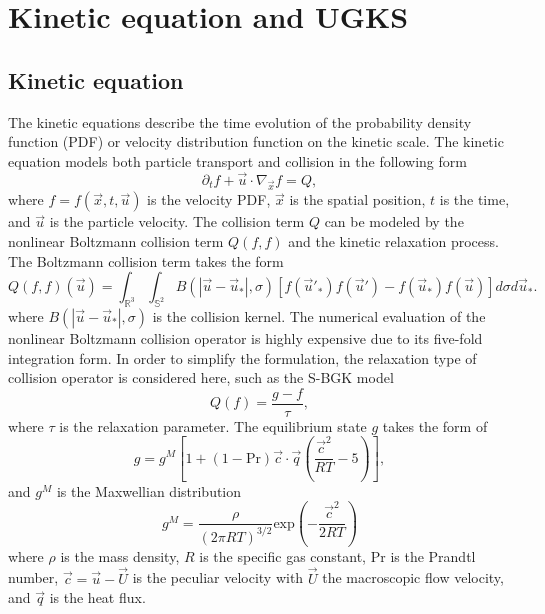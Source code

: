 \documentclass[3p,12pt]{elsarticle}
\begin{document}
	\section{Kinetic equation and UGKS}\label{UGKS}
	
	\subsection{Kinetic equation}
	
	The kinetic equations describe the time evolution of the probability density function (PDF) or velocity distribution function on the kinetic scale.
	The kinetic equation models both particle transport and  collision in the following form
	\begin{equation}
		\partial _t f + \vec{u} \cdot \nabla_{\vec{x}} f = Q,
		\label{KinEq}\end{equation}
	where $f = f(\vec{x}, t, \vec{u})$ is the velocity PDF, $\vec{x}$ is the spatial position, $t$ is the time, and $\vec{u}$ is the particle velocity.
The collision term $Q$ can be modeled by the nonlinear Boltzmann collision term $Q(f,f)$ and the kinetic relaxation process.
The Boltzmann collision term takes the form
	\begin{equation}\label{Boltzmanncollision}
		Q(f,f)(\vec{u}) = \int_{\mathbb{R}^3}\int_{\mathbb{S}^{2}}B(|\vec{u}-\vec{u}_{*}|,\sigma) \left[ f(\vec{u}'_{*})f(\vec{u}') - f(\vec{u}_{*})f(\vec{u})\right]d\sigma d\vec{u}_{*}.
	\end{equation}
where $B(|\vec{u}-\vec{u}_{*}|,\sigma)$ is the collision kernel.
The numerical evaluation of the nonlinear Boltzmann collision operator is highly expensive due to its five-fold integration form. In order to simplify the formulation, the relaxation type of collision operator is considered here, such as the S-BGK model
	\begin{equation}
		Q(f) = \frac{g - f}{\tau},
	\end{equation}
	where $\tau$ is the relaxation parameter. The equilibrium state $g$ takes the form of
	\begin{equation}
		g = g^M\left[ 1 + (1 - \mathrm{Pr})\vec{c}\cdot \vec{q}\left(\frac{\vec{c}^2}{RT} - 5 \right)\right],
	\end{equation}
and $g^M$ is the Maxwellian distribution
\begin{equation}
g^M = \frac{\rho}{(2\pi RT)^{3/2}}\mathrm{exp}\left( -\frac{\vec{c}^2}{2RT}\right)	
\end{equation}
	where $\rho$ is the mass density, $R$ is the specific gas constant, $\mathrm{Pr}$ is the Prandtl number, $\vec{c} = \vec{u} - \vec{U}$ is the peculiar velocity with $\vec{U}$ the macroscopic flow velocity, and $\vec{q}$ is the heat flux.
\end{document}
